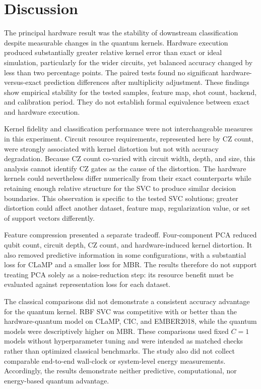 \documentclass[letterpaper]{article} %
\begin{document}
\section{Discussion}

The principal hardware result was the stability of downstream classification despite measurable changes in the quantum kernels. Hardware execution produced substantially greater relative kernel error than exact or ideal simulation, particularly for the wider circuits, yet balanced accuracy changed by less than two percentage points. The paired tests found no significant hardware-versus-exact prediction differences after multiplicity adjustment. These findings show empirical stability for the tested samples, feature map, shot count, backend, and calibration period. They do not establish formal equivalence between exact and hardware execution.

Kernel fidelity and classification performance were not interchangeable measures in this experiment. Circuit resource requirements, represented here by CZ count, were strongly associated with kernel distortion but not with accuracy degradation. Because CZ count co-varied with circuit width, depth, and size, this analysis cannot identify CZ gates as the cause of the distortion. The hardware kernels could nevertheless differ numerically from their exact counterparts while retaining enough relative structure for the SVC to produce similar decision boundaries. This observation is specific to the tested SVC solutions; greater distortion could affect another dataset, feature map, regularization value, or set of support vectors differently.

Feature compression presented a separate tradeoff. Four-component PCA reduced qubit count, circuit depth, CZ count, and hardware-induced kernel distortion. It also removed predictive information in some configurations, with a substantial loss for CLaMP and a smaller loss for MBR. The results therefore do not support treating PCA solely as a noise-reduction step: its resource benefit must be evaluated against representation loss for each dataset.

The classical comparisons did not demonstrate a consistent accuracy advantage for the quantum kernel. RBF SVC was competitive with or better than the hardware-quantum model on CLaMP, CIC, and EMBER2018, while the quantum models were descriptively higher on MBR. These comparisons used fixed $C=1$ models without hyperparameter tuning and were intended as matched checks rather than optimized classical benchmarks. The study also did not collect comparable end-to-end wall-clock or system-level energy measurements. Accordingly, the results demonstrate neither predictive, computational, nor energy-based quantum advantage.
\end{document}
